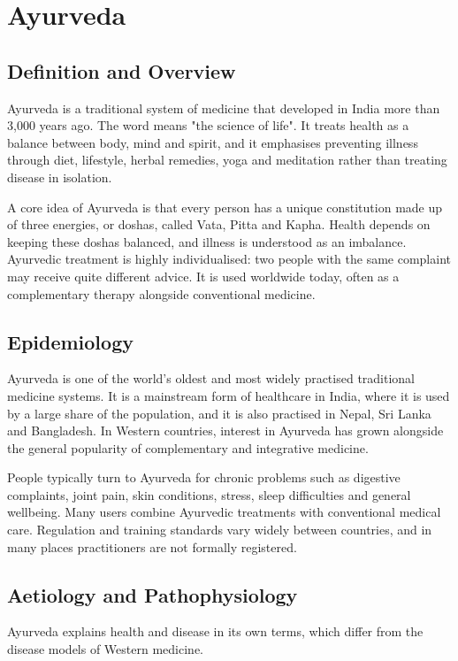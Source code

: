 \chapter{Ayurveda}

\section*{Definition and Overview}
Ayurveda is a traditional system of medicine that developed in India more than 3,000 years ago. The word means "the science of life". It treats health as a balance between body, mind and spirit, and it emphasises preventing illness through diet, lifestyle, herbal remedies, yoga and meditation rather than treating disease in isolation.

A core idea of Ayurveda is that every person has a unique constitution made up of three energies, or doshas, called Vata, Pitta and Kapha. Health depends on keeping these doshas balanced, and illness is understood as an imbalance. Ayurvedic treatment is highly individualised: two people with the same complaint may receive quite different advice. It is used worldwide today, often as a complementary therapy alongside conventional medicine.

\section*{Epidemiology}
Ayurveda is one of the world's oldest and most widely practised traditional medicine systems. It is a mainstream form of healthcare in India, where it is used by a large share of the population, and it is also practised in Nepal, Sri Lanka and Bangladesh. In Western countries, interest in Ayurveda has grown alongside the general popularity of complementary and integrative medicine.

People typically turn to Ayurveda for chronic problems such as digestive complaints, joint pain, skin conditions, stress, sleep difficulties and general wellbeing. Many users combine Ayurvedic treatments with conventional medical care. Regulation and training standards vary widely between countries, and in many places practitioners are not formally registered.

\section*{Aetiology and Pathophysiology}
Ayurveda explains health and disease in its own terms, which differ from the disease models of Western medicine.

